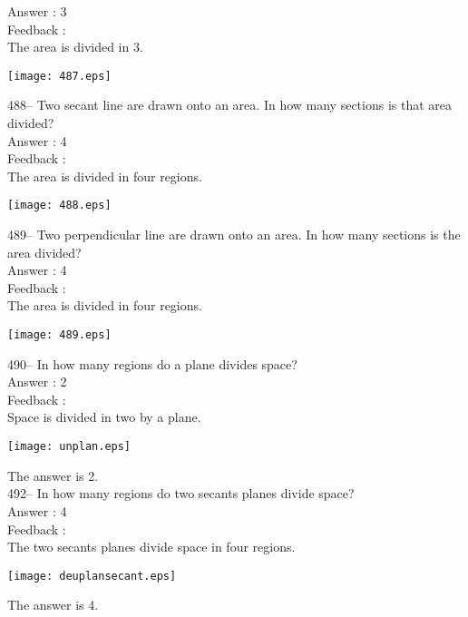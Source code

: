 ﻿\documentclass[letterpaper, 12pt]{article}
\begin{document}
Answer : 3\\

Feedback : \\
The area is divided in 3.\\
\begin{center}
\texttt{[image: 487.eps]}
\end{center}

488-- Two secant line are drawn onto an area. In how many sections is that area divided?\\

Answer : 4\\

Feedback : \\
The area is divided in four regions.\\
\begin{center}
\texttt{[image: 488.eps]}
\end{center}

489-- Two perpendicular line are drawn onto an area. In how many sections is the area divided?\\

Answer : 4\\

Feedback :\\
The area is divided in four regions.\\
\begin{center}
\texttt{[image: 489.eps]}
\end{center}


490-- In how many regions do a plane divides space?\\

Answer : 2\\

Feedback : \\
Space is divided in two by a plane.\\
    \begin{center}
    \texttt{[image: unplan.eps]}
    \end{center}

The answer is 2.\\


492-- In how many regions do two secants planes divide space?\\

Answer : 4\\

Feedback :\\
The two secants planes divide space in four regions.\\
    \begin{center}
    \texttt{[image: deuplansecant.eps]}
    \end{center}
The answer is 4.\\
\end{document}
